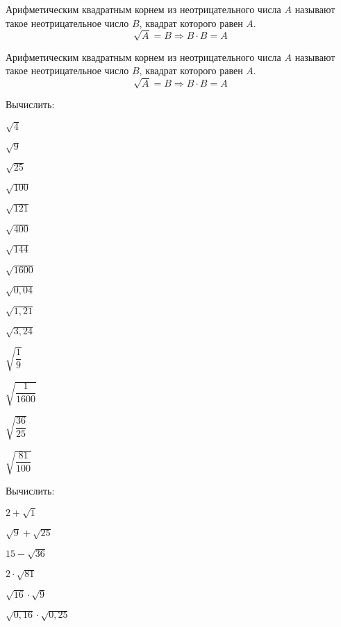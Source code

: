 %
%
%
%
\begin{class}[number=1]
	\begin{definit}
		Арифметическим квадратным корнем из неотрицательного числа \( A \) называют такое неотрицательное число \( B \), квадрат которого равен \( A \).
		\[ \sqrt{A}=B \Rightarrow B\cdot B = A \]
	\end{definit}
	\begin{definit}
		Арифметическим квадратным корнем из неотрицательного числа \( A \) называют такое неотрицательное число \( B \), квадрат которого равен \( A \).
		\[ \sqrt{A}=B \Rightarrow B\cdot B = A \]
	\end{definit}
	\begin{listofex}
		\item Вычислить:
		\begin{enumcols}[itemcolumns=6]
			\item \( \sqrt{4} \)
			\item \( \sqrt{9} \)
			\item \( \sqrt{25} \)
			\item \( \sqrt{100} \)
			\item \( \sqrt{121} \)
			\item \( \sqrt{400} \)
			\item \( \sqrt{144} \)
			\item \( \sqrt{1600} \)
			\item \( \sqrt{0,04} \)
			\item \( \sqrt{1,21} \)
			\item \( \sqrt{3,24} \)
			\item \( \sqrt{\dfrac{1}{9}} \)
			\item \( \sqrt{\dfrac{1}{1600}} \)
			\item \( \sqrt{\dfrac{36}{25}} \)
			\item \( \sqrt{\dfrac{81}{100}} \)
		\end{enumcols}
		\item Вычислить:
		\begin{enumcols}[itemcolumns=4]
			\item \( 2+\sqrt{1} \)
			\item \( \sqrt{9}+\sqrt{25} \)
			\item \( 15-\sqrt{36} \)
			\item \( 2\cdot\sqrt{81} \)
			\item \( \sqrt{16}\cdot\sqrt{9} \)
			\item \( \sqrt{0,16}\cdot\sqrt{0,25} \)

\end{enumcols}
\end{listofex}
\end{class}
